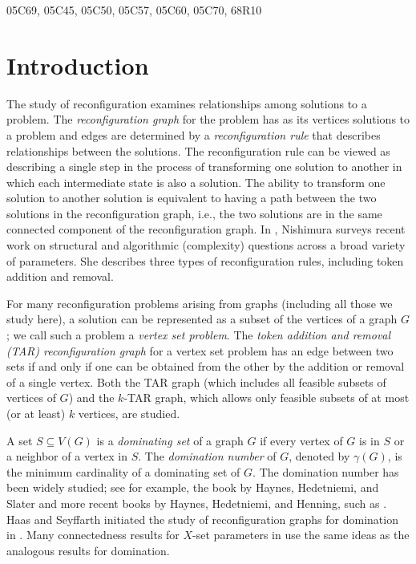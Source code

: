 \documentclass{article}
\numberwithin{figure}{section}
\numberwithin{table}{section}
\numberwithin{equation}{section}
\theoremstyle{definition}
\theoremstyle{definition}
\theoremstyle{definition}
\newcommand{\noi}{\noindent}
\begin{document}
\noi{\bf AMS subject classification} 05C69, 05C45, 05C50, 05C57,  05C60, 05C70, 68R10 



\section{Introduction}





The study of reconfiguration examines relationships among solutions to a problem. The \emph{reconfiguration graph} for the problem has as its vertices solutions to a problem and edges are determined by a \emph{reconfiguration rule} that describes  relationships between the solutions. The reconfiguration rule can be viewed as describing a single step in the process of transforming  one solution  
 to another in which each intermediate state is also a solution.  The ability to transform one solution to another solution is equivalent to having a path between the two solutions in the reconfiguration graph, i.e., the two solutions are in the same connected component of the reconfiguration graph.  
In \cite{Nish18}, Nishimura  surveys recent work on structural and algorithmic (complexity) questions   across a broad variety of parameters. She describes three types of reconfiguration rules, including  token addition and removal.  

For many reconfiguration problems arising from  graphs (including all those we study here), a solution can be represented as a subset of the vertices of a graph $G$; we call such a problem a \emph{vertex set problem}. The \emph{token addition and removal (TAR) reconfiguration graph} for a vertex set problem has an edge between two sets  if and only if one can be obtained from the other by the addition or removal of a single vertex.   Both the TAR graph (which includes all feasible subsets of vertices of $G$) and the $k$-TAR graph, which allows only feasible subsets of at most  (or at least) $k$ vertices, are studied. 

A set $S\subseteq V(G)$ is a \emph{dominating  set} of a graph $G$ if every vertex of $G$ is in $S$ or a neighbor of a vertex in $S$.  The \emph{domination number}  of $G$, denoted by $\gamma(G)$, is the minimum cardinality of a dominating set of $G$.  The domination number has been widely studied; see for example, the book by Haynes, Hedetniemi, and Slater \cite{HHS98} and more recent books by Haynes, Hedetniemi, and Henning, such as \cite{HHH23}.  Haas and Seyffarth initiated the study of reconfiguration graphs for domination in \cite{HS14}. 
 Many connectedness results for $X$-set parameters in \cite{PDrecon} use the same ideas as  the analogous results for domination. 
\end{document}
